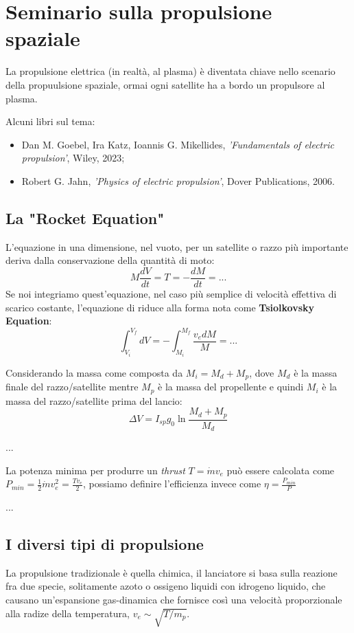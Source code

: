 \documentclass{book}
\begin{document}
\section{Seminario sulla propulsione spaziale}
La propulsione elettrica (in realtà, al plasma) è diventata chiave nello scenario della propuulsione spaziale, ormai ogni satellite ha a bordo un propulsore al plasma.

Alcuni libri sul tema:
\begin{itemize}
    \item Dan M. Goebel, Ira Katz, Ioannis G. Mikellides, \emph{'Fundamentals of electric propulsion'}, Wiley, 2023;
    \item Robert G. Jahn, \emph{'Physics of electric propulsion'}, Dover Publications, 2006. 
\end{itemize}


\subsection{La "Rocket Equation"}
L'equazione in una dimensione, nel vuoto, per un satellite o razzo più importante deriva dalla conservazione della quantità di moto:
\begin{equation}
    M\frac{dV}{dt}=T=-\frac{dM}{dt}=...
\end{equation}
Se noi integriamo quest'equazione, nel caso più semplice di velocità effettiva di scarico costante, l'equazione di riduce alla forma nota come \textbf{Tsiolkovsky Equation}:
\[ \int^{V_f}_{V_i} dV = - \int^{M_f}_{M_i} \frac{v_edM}{M} = ... \]

Considerando la massa come composta da $M_i=M_d+M_p$, dove $M_d$ è la massa finale del razzo/satellite mentre $M_p$ è la massa del propellente e quindi $M_i$ è la massa del razzo/satellite prima del lancio:
\[ \Delta V = I_{sp} g_0 \ln\frac{M_d+M_p}{M_d} \]

...

La potenza minima per produrre un \emph{thrust} $T=\dot{m} v_e$ può essere calcolata come $P_{min} = \frac{1}{2} \dot m v_e ^ 2 = \frac{Tv_e}{2}$, possiamo definire l'efficienza invece come $\eta = \frac{P_{min}}{P}$

...



\subsection{I diversi tipi di propulsione}
La propulsione tradizionale è quella chimica, il lanciatore si basa sulla reazione fra due specie, solitamente azoto o ossigeno liquidi con idrogeno liquido, che causano un'espansione gas-dinamica che fornisce così una velocità proporzionale alla radize della temperatura, $v_e\sim \sqrt{T/m_p}$.
\end{document}
